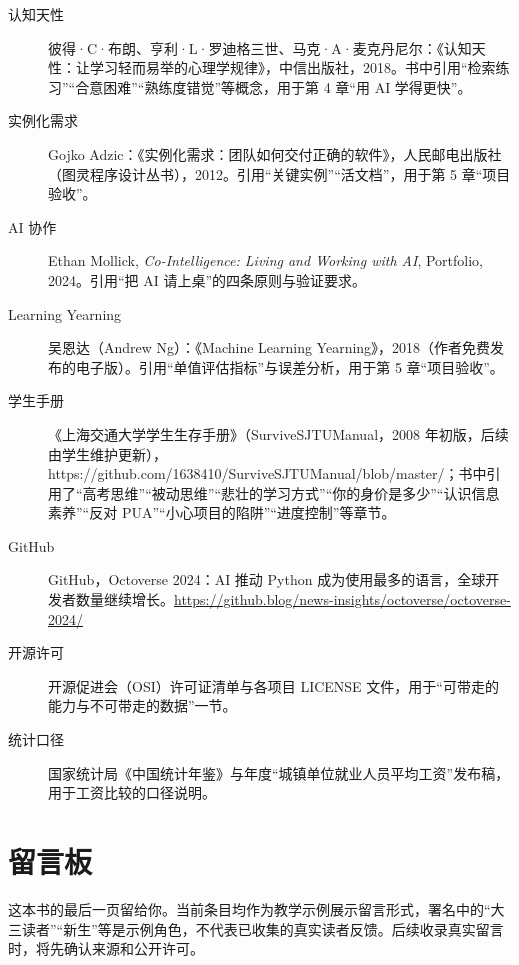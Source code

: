 \documentclass[UTF8,zihao=5,openany]{ctexbook}
\begin{document}
{\begin{description}
\item[认知天性] 彼得·C·布朗、亨利·L·罗迪格三世、马克·A·麦克丹尼尔：《认知天性：让学习轻而易举的心理学规律》，中信出版社，2018。书中引用“检索练习”“合意困难”“熟练度错觉”等概念，用于第 4 章“用 AI 学得更快”。
\item[实例化需求] Gojko Adzic：《实例化需求：团队如何交付正确的软件》，人民邮电出版社（图灵程序设计丛书），2012。引用“关键实例”“活文档”，用于第 5 章“项目验收”。
\item[AI 协作] Ethan Mollick, \emph{Co-Intelligence: Living and Working with AI}, Portfolio, 2024。引用“把 AI 请上桌”的四条原则与验证要求。
\item[Learning Yearning] 吴恩达（Andrew Ng）：《Machine Learning Yearning》，2018（作者免费发布的电子版）。引用“单值评估指标”与误差分析，用于第 5 章“项目验收”。
\item[学生手册] 《上海交通大学学生生存手册》（SurviveSJTUManual，2008 年初版，后续由学生维护更新），https://github.com/1638410/SurviveSJTUManual/blob/master/；书中引用了“高考思维”“被动思维”“悲壮的学习方式”“你的身价是多少”“认识信息素养”“反对 PUA”“小心项目的陷阱”“进度控制”等章节。
\item[GitHub] GitHub，Octoverse 2024：AI 推动 Python 成为使用最多的语言，全球开发者数量继续增长。\url{https://github.blog/news-insights/octoverse/octoverse-2024/}
\item[开源许可] 开源促进会（OSI）许可证清单与各项目 LICENSE 文件，用于“可带走的能力与不可带走的数据”一节。
\item[统计口径] 国家统计局《中国统计年鉴》与年度“城镇单位就业人员平均工资”发布稿，用于工资比较的口径说明。
\end{description}
}


\chapter{留言板}

这本书的最后一页留给你。当前条目均作为教学示例展示留言形式，署名中的“大三读者”“新生”等是示例角色，不代表已收集的真实读者反馈。后续收录真实留言时，将先确认来源和公开许可。

\vspace{0.2cm}



\vspace{0.25cm}
\end{document}
